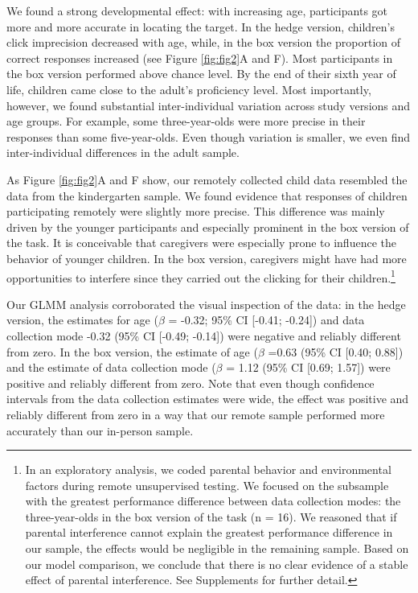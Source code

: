 \documentclass[
  man,floatsintext]{apa6}
\begin{document}
We found a strong developmental effect: with increasing age, participants got more and more accurate in locating the target. In the hedge version, children's click imprecision decreased with age, while, in the box version the proportion of correct responses increased (see Figure \ref{fig:fig2}A and F). Most participants in the box version performed above chance level. By the end of their sixth year of life, children came close to the adult's proficiency level. Most importantly, however, we found substantial inter-individual variation across study versions and age groups. For example, some three-year-olds were more precise in their responses than some five-year-olds. Even though variation is smaller, we even find inter-individual differences in the adult sample.

As Figure \ref{fig:fig2}A and F show, our remotely collected child data resembled the data from the kindergarten sample.
We found evidence that responses of children participating remotely were slightly more precise. This difference was mainly driven by the younger participants and especially prominent in the box version of the task. It is conceivable that caregivers were especially prone to influence the behavior of younger children. In the box version, caregivers might have had more opportunities to interfere since they carried out the clicking for their children.\footnote{In an exploratory analysis, we coded parental behavior and environmental factors during remote unsupervised testing. We focused on the subsample with the greatest performance difference between data collection modes: the three-year-olds in the box version of the task (n = 16). We reasoned that if parental interference cannot explain the greatest performance difference in our sample, the effects would be negligible in the remaining sample. Based on our model comparison, we conclude that there is no clear evidence of a stable effect of parental interference. See Supplements for further detail.}

Our GLMM analysis corroborated the visual inspection of the data: in the hedge version, the estimates for age (\(\beta\) = -0.32; 95\% CI {[}-0.41; -0.24{]}) and data collection mode -0.32 (95\% CI {[}-0.49; -0.14{]}) were negative and reliably different from zero.
In the box version, the estimate of age (\(\beta\) =0.63 (95\% CI {[}0.40; 0.88{]}) and the estimate of data collection mode (\(\beta\) = 1.12 (95\% CI {[}0.69; 1.57{]}) were positive and reliably different from zero. Note that even though confidence intervals from the data collection estimates were wide, the effect was positive and reliably different from zero in a way that our remote sample performed more accurately than our in-person sample.
\end{document}
